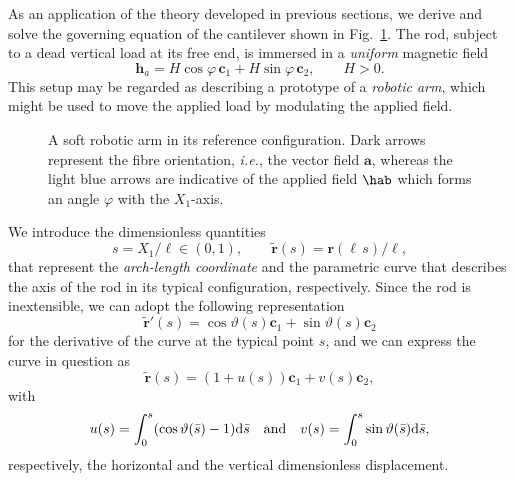 \documentclass[oneside]{article}
\begin{document}
			As an application of the theory developed in previous sections, we derive and solve the governing equation of the cantilever  shown in Fig.~\ref{fig:robotic_arm}. The rod, subject to a dead vertical load at its free end, is immersed in a \emph{uniform} magnetic field
			\begin{equation}
			\bm h_a=H\cos\varphi\,\bm c_1+H\sin\varphi\,\bm c_2,\qquad H>0.
			\end{equation}
			This setup may be regarded as describing a prototype of a \emph{robotic arm}, which might be used to move the applied load by modulating the applied field. 
			\begin{figure}[h]
				\begin{center}
					\begin{tiny}
						\def\svgwidth{.5\textwidth}
						
					\end{tiny}
					\caption{A soft robotic arm in its reference configuration. Dark arrows represent the fibre orientation, \textit{i.e.}, the vector field ${\bm a}$, whereas the light blue arrows are indicative of the applied field $\hab$ which forms an angle $\varphi$ with the $X_1$-axis.}
					\label{fig:robotic_arm}
				\end{center}
			\end{figure}
			
			We introduce the dimensionless quantities 
			\begin{equation*}
			s=X_1/\ell\in(0,1), \qquad \tilde{\bm r}(s) = \bm r(\ell\,s)/\ell,
			\end{equation*} 
			that represent the \emph{arch-length coordinate} and the parametric curve that describes the axis of the rod in its typical configuration, respectively. Since the rod is inextensible, we can adopt the following representation 
			\begin{equation}\label{eq:901}
			\tilde{\bm r}'(s)=\cos\vartheta(s)\bm c_1+\sin\vartheta(s)\bm c_2
			\end{equation}
			for the derivative of the curve at the typical point $s$, and we can express the curve in question as 
			\begin{equation}\label{eq:902}
			\tilde{\bm r}(s)=(1+u(s))\bm c_1+v(s)\bm c_2,
			\end{equation}
			with
			\begin{equation}\label{displ}
			u(s)=\int_0^s(\cos\vartheta(\bar s)-1)\text d\bar s\quad \text{and}\quad v(s)=\int_0^s\sin\vartheta(\bar s)\text d\bar s,
			\end{equation}
			respectively, the horizontal and the vertical dimensionless displacement.
			
\end{document}
